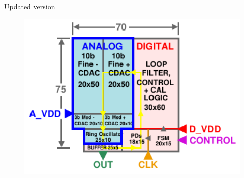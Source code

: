 \documentclass[t, screen, aspectratio=43]{beamer}
\begin{document}
\begin{frame}
\begin{block}{Updated version}
\begin{minipage}{6cm}
			\vspace{-3.5em}
			\begin{figure}[htb!]
			        \centering
			        \includegraphics[width=1\textwidth, angle=0]{pll_floorplan2}
			\end{figure}
		\end{minipage}%

	\end{block}	
\end{frame}
\end{document}
